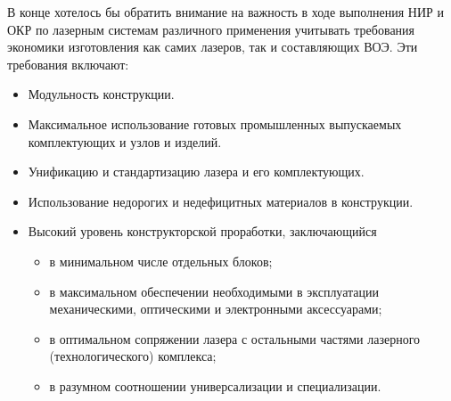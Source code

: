 В конце хотелось бы обратить внимание на важность в ходе  выполнения НИР и ОКР по лазерным системам различного применения учитывать требования экономики изготовления как самих лазеров, так и составляющих ВОЭ. Эти требования включают:
\begin{itemize}
    \item Модульность конструкции.
    \item Максимальное использование готовых промышленных выпускаемых комплектующих и узлов и изделий.
    \item Унификацию и стандартизацию лазера и его комплектующих.
    \item Использование недорогих и недефицитных материалов в конструкции.
    \item Высокий уровень конструкторской проработки, заключающийся
    \begin{itemize}
    \item в минимальном числе отдельных блоков;
    \item в максимальном обеспечении необходимыми в эксплуатации механическими, оптическими и электронными аксессуарами;
    \item в оптимальном сопряжении лазера с остальными частями лазерного (технологического) комплекса;
    \item в разумном соотношении универсализации и специализации.
    \end{itemize}
\end{itemize}


\clearpage
